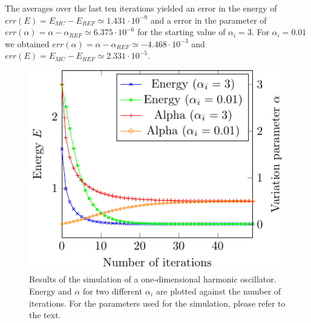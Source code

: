 The averages over the last ten iterations yielded an
error in the energy of $err(E)=E_{MC}-E_{REF}\simeq 1.431\cdot 10^{-9}$ and a error in the parameter of $err(\alpha)=\alpha - \alpha_{REF} \simeq 6.375\cdot 10^{-6}$ for the starting value of $\alpha_i=3$. For $\alpha_i = 0.01$ we obtained $err(\alpha)=\alpha - \alpha_{REF} \simeq -4.468 \cdot 10^{-3}$ and $err(E)=E_{MC}-E_{REF}\simeq 2.331\cdot 10^{-5}$. 
\begin{figure}[th]
	\begin{center}
		\includegraphics[scale=0.9]{graphs/ho-e-alpha-iterations.pdf}
		\caption{
			Results of the simulation of a one-dimensional harmonic oscillator. Energy and $\alpha$ for two different $\alpha_i$ are plotted against the number of iterations. For the parameters used for the simulation, please refer to the text.
			}
		\label{fig:Ho_it}
	\end{center}
\end{figure}
